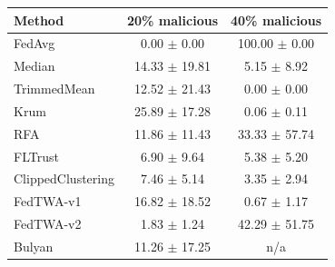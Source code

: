 \begin{tabular}{lcc}
\toprule
Method & 20\% malicious & 40\% malicious \\
\midrule
FedAvg & 0.00 $\pm$ 0.00 & 100.00 $\pm$ 0.00 \\
Median & 14.33 $\pm$ 19.81 & 5.15 $\pm$ 8.92 \\
TrimmedMean & 12.52 $\pm$ 21.43 & 0.00 $\pm$ 0.00 \\
Krum & 25.89 $\pm$ 17.28 & 0.06 $\pm$ 0.11 \\
RFA & 11.86 $\pm$ 11.43 & 33.33 $\pm$ 57.74 \\
FLTrust & 6.90 $\pm$ 9.64 & 5.38 $\pm$ 5.20 \\
ClippedClustering & 7.46 $\pm$ 5.14 & 3.35 $\pm$ 2.94 \\
FedTWA-v1 & 16.82 $\pm$ 18.52 & 0.67 $\pm$ 1.17 \\
FedTWA-v2 & 1.83 $\pm$ 1.24 & 42.29 $\pm$ 51.75 \\
Bulyan & 11.26 $\pm$ 17.25 & n/a \\
\bottomrule
\end{tabular}